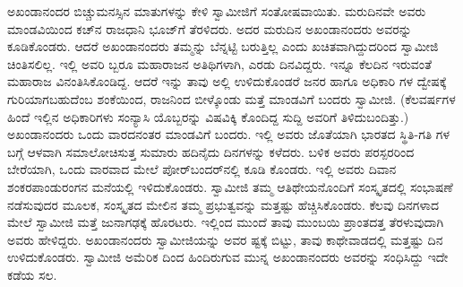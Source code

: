 ಅಖಂಡಾನಂದರ ಬಿಚ್ಚುಮನಸ್ಸಿನ ಮಾತುಗಳನ್ನು ಕೇಳಿ ಸ್ವಾಮೀಜಿಗೆ ಸಂತೋಷವಾಯಿತು. ಮರುದಿನವೇ ಅವರು ಮಾಂಡವಿಯಿಂದ ಕಚ್​ನ ರಾಜಧಾನಿ ಭೂಜ್​ಗೆ ತೆರಳಿದರು. ಅದರ ಮರುದಿನ ಅಖಂಡಾನಂದರು ಅವರನ್ನು ಕೂಡಿಕೊಂಡರು. ಆದರೆ ಅಖಂಡಾನಂದರು ತಮ್ಮನ್ನು ಬೆನ್ನಟ್ಟಿ ಬರುತ್ತಿಲ್ಲ ಎಂದು ಖಚಿತವಾಗಿದ್ದುದರಿಂದ ಸ್ವಾಮೀಜಿ ಚಿಂತಿಸಲಿಲ್ಲ. ಇಲ್ಲಿ ಅವರಿ ಬ್ಬರೂ ಮಹಾರಾಜನ ಅತಿಥಿಗಳಾಗಿ, ಎರಡು ದಿನವಿದ್ದರು. ಇನ್ನೂ ಕೆಲದಿನ ಇರುವಂತೆ ಮಹಾರಾಜ ವಿನಂತಿಸಿಕೊಂಡಿದ್ದ. ಆದರೆ ಇನ್ನು ತಾವು ಅಲ್ಲಿ ಉಳಿದುಕೊಂಡರೆ ಜನರ ಹಾಗೂ ಅಧಿಕಾರಿ ಗಳ ದ್ವೇಷಕ್ಕೆ ಗುರಿಯಾಗಬಹುದೆಂಬ ಶಂಕೆಯಿಂದ, ರಾಜನಿಂದ ಬೀಳ್ಕೊಂಡು ಮತ್ತೆ ಮಾಂಡವಿಗೆ ಬಂದರು ಸ್ವಾಮೀಜಿ. (ಕೆಲವರ್ಷಗಳ ಹಿಂದೆ ಇಲ್ಲಿನ ಅಧಿಕಾರಿಗಳು ಸಂನ್ಯಾಸಿ ಯೊಬ್ಬರನ್ನು ವಿಷವಿಕ್ಕಿ ಕೊಂದಿದ್ದ ಸುದ್ದಿ ಅವರಿಗೆ ತಿಳಿದುಬಂದಿತ್ತು.) ಅಖಂಡಾನಂದರು ಒಂದು ವಾರದನಂತರ ಮಾಂಡವಿಗೆ ಬಂದರು. ಇಲ್ಲಿ ಅವರು ಜೊತೆಯಾಗಿ ಭಾರತದ ಸ್ಥಿತಿ-ಗತಿ ಗಳ ಬಗ್ಗೆ ಆಳವಾಗಿ ಸಮಾಲೋಚಿಸುತ್ತ ಸುಮಾರು ಹದಿನೈದು ದಿನಗಳನ್ನು ಕಳೆದರು. ಬಳಿಕ ಅವರು ಪರಸ್ಪರರಿಂದ ಬೇರೆಯಾಗಿ, ಒಂದು ವಾರವಾದ ಮೇಲೆ ಪೋರ್​ಬಂದರ್​ನಲ್ಲಿ ಕೂಡಿ ಕೊಂಡರು. ಇಲ್ಲಿ ಅವರು ದಿವಾನ ಶಂಕರಪಾಂಡುರಂಗನ ಮನೆಯಲ್ಲಿ ಇಳಿದುಕೊಂಡರು. ಸ್ವಾಮೀಜಿ ತಮ್ಮ ಆತಿಥೇಯನೊಂದಿಗೆ ಸಂಸ್ಕೃತದಲ್ಲಿ ಸಂಭಾಷಣೆ ನಡೆಸುವುದರ ಮೂಲಕ, ಸಂಸ್ಕೃತದ ಮೇಲಿನ ತಮ್ಮ ಪ್ರಭುತ್ವವನ್ನು ಮತ್ತಷ್ಟು ಹೆಚ್ಚಿಸಿಕೊಂಡರು. ಕೆಲವು ದಿನಗಳಾದ ಮೇಲೆ ಸ್ವಾಮೀಜಿ ಮತ್ತೆ ಜುನಾಗಢಕ್ಕೆ ಹೊರಟರು. ಇಲ್ಲಿಂದ ಮುಂದೆ ತಾವು ಮುಂಬಯಿ ಪ್ರಾಂತದತ್ತ ತೆರಳುವುದಾಗಿ ಅವರು ಹೇಳಿದ್ದರು. ಅಖಂಡಾನಂದರು ಸ್ವಾಮೀಜಿಯನ್ನು ಅವರ ಷ್ಟಕ್ಕೆ ಬಿಟ್ಟು, ತಾವು ಕಾಥೇವಾಡದಲ್ಲಿ ಮತ್ತಷ್ಟು ದಿನ ಉಳಿದುಕೊಂಡರು. ಸ್ವಾಮೀಜಿ ಅಮೆರಿಕ ದಿಂದ ಹಿಂದಿರುಗುವ ಮುನ್ನ ಅಖಂಡಾನಂದರು ಅವರನ್ನು ಸಂಧಿಸಿದ್ದು ಇದೇ ಕಡೆಯ ಸಲ.

